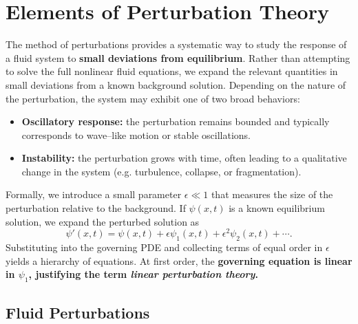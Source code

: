 \section{Elements of Perturbation Theory}

The method of perturbations provides a systematic way to study the response of a fluid system to \textbf{small deviations from equilibrium}.  Rather than attempting to solve the full nonlinear fluid equations, we expand the relevant quantities in small deviations from a known background solution.  
Depending on the nature of the perturbation, the system may exhibit one of two broad behaviors:
\vspace{0.25cm}
\begin{itemize}
    \item \textbf{Oscillatory response:} the perturbation remains bounded and typically corresponds to wave–like motion or stable oscillations.
    \item \textbf{Instability:} the perturbation grows with time, often leading to a qualitative change in the system (e.g. turbulence, collapse, or fragmentation).
\end{itemize}
\vspace{0.25cm}
Formally, we introduce a small parameter $\epsilon \ll 1$ that measures the size of the perturbation relative to the background.  
If $\psi(x,t)$ is a known equilibrium solution, we expand the perturbed solution as
\[
\psi'(x,t) = \psi(x,t) + \epsilon \psi_1(x,t) + \epsilon^2 \psi_2(x,t) + \cdots.
\]
Substituting into the governing PDE and collecting terms of equal order in $\epsilon$ yields a hierarchy of equations.  
At first order, the \textbf{governing equation is linear in $\psi_1$, justifying the term \emph{linear perturbation theory}.}


\subsection{Fluid Perturbations}

